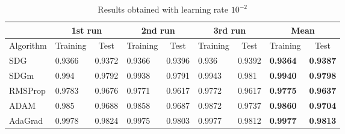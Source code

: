 \documentclass[12pt]{article}
\begin{document}
\begin{table}
\centering
\begin{tabular}{l|l|l|l|l|l|l|l|l|}
\cline{2-9}
 & \multicolumn{2}{c|}{1st run} & \multicolumn{2}{c|}{2nd run} & \multicolumn{2}{c|}{3rd run} & \multicolumn{2}{c|}{Mean} \\ \hline
\multicolumn{1}{|l|}{Algorithm} & \multicolumn{1}{c|}{Training} & \multicolumn{1}{c|}{Test} & \multicolumn{1}{c|}{Training} & \multicolumn{1}{c|}{Test} & \multicolumn{1}{c|}{Training} & \multicolumn{1}{c|}{Test} & \multicolumn{1}{c|}{Training} & \multicolumn{1}{c|}{Test} \\ \hline
\multicolumn{1}{|l|}{SDG} & 0.9366 & 0.9372 & 0.9366 & 0.9396 & 0.936 & 0.9392 & \textbf{0.9364} & \textbf{0.9387} \\ \cline{1-1}
\multicolumn{1}{|l|}{SDGm} & 0.994 & 0.9792 & 0.9938 & 0.9791 & 0.9943 & 0.981 & \textbf{0.9940} & \textbf{0.9798} \\ \cline{1-1}
\multicolumn{1}{|l|}{RMSProp} & 0.9783 & 0.9676 & 0.9771 & 0.9617 & 0.9772 & 0.9617 & \textbf{0.9775} & \textbf{0.9637} \\ \cline{1-1}
\multicolumn{1}{|l|}{ADAM} & 0.985 & 0.9688 & 0.9858 & 0.9687 & 0.9872 & 0.9737 & \textbf{0.9860} & \textbf{0.9704} \\ \cline{1-1}
\multicolumn{1}{|l|}{AdaGrad} & 0.9978 & 0.9824 & 0.9975 & 0.9803 & 0.9977 & 0.9812 & \textbf{0.9977} & \textbf{0.9813} \\ \hline
\end{tabular}
\caption{Results obtained with learning rate $10^{-2}$}
\label{tab:1e-2}
\end{table}
\end{document}
